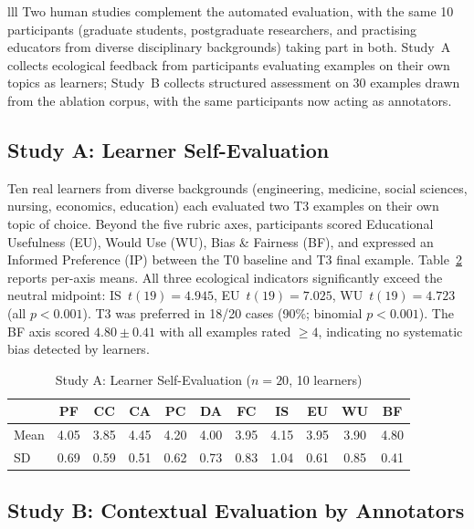 \documentclass[conference]{IEEEtran}
\begin{document}
\begin{table}[htbp]
\begin{center}
\begin{tabular}{lll}
Two human studies complement the automated evaluation, with the same 10 participants (graduate students, postgraduate researchers, and practising educators from diverse disciplinary backgrounds) taking part in both. Study~A collects ecological feedback from participants evaluating examples on their own topics as learners; Study~B collects structured assessment on 30 examples drawn from the ablation corpus, with the same participants now acting as annotators.

\subsection{Study A: Learner Self-Evaluation}

Ten real learners from diverse backgrounds (engineering, medicine, social sciences, nursing, economics, education) each evaluated two T3 examples on their own topic of choice. Beyond the five rubric axes, participants scored Educational Usefulness (EU), Would Use (WU), Bias \& Fairness (BF), and expressed an Informed Preference (IP) between the T0 baseline and T3 final example. Table~\ref{tab:study_a} reports per-axis means. All three ecological indicators significantly exceed the neutral midpoint: IS~$t(19) = 4.945$, EU~$t(19) = 7.025$, WU~$t(19) = 4.723$ (all $p < 0.001$). T3 was preferred in 18/20 cases (90\%; binomial $p < 0.001$). The BF axis scored $4.80 \pm 0.41$ with all examples rated $\geq 4$, indicating no systematic bias detected by learners.

\begin{table}[htbp]
\caption{Study A: Learner Self-Evaluation ($n=20$, 10 learners)}
\label{tab:study_a}
\begin{center}
\scriptsize
\setlength{\tabcolsep}{3pt}
\begin{tabular}{lcccccccccc}
\toprule
 & \textbf{PF} & \textbf{CC} & \textbf{CA} & \textbf{PC} & \textbf{DA} & \textbf{FC} & \textbf{IS} & \textbf{EU} & \textbf{WU} & \textbf{BF} \\
\midrule
Mean & 4.05 & 3.85 & 4.45 & 4.20 & 4.00 & 3.95 & 4.15 & 3.95 & 3.90 & 4.80 \\
SD   & 0.69 & 0.59 & 0.51 & 0.62 & 0.73 & 0.83 & 1.04 & 0.61 & 0.85 & 0.41 \\
\bottomrule
\end{tabular}
\end{center}
\end{table}

\subsection{Study B: Contextual Evaluation by Annotators}


\end{tabular}
\end{center}
\end{table}
\end{document}
